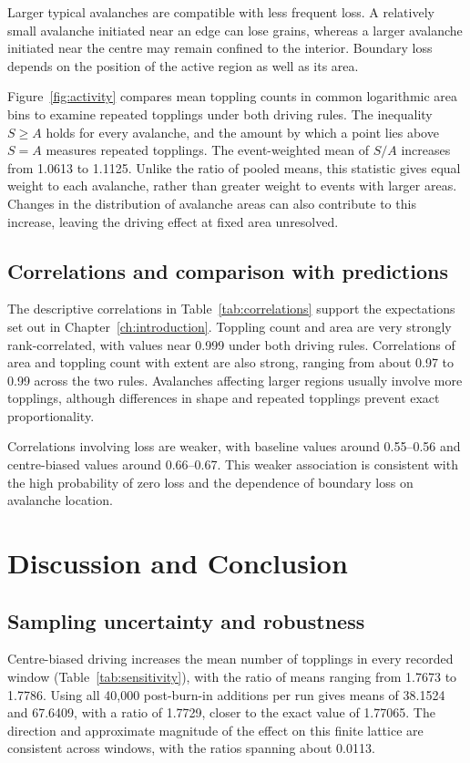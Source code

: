 \documentclass[11pt,a4paper,oneside]{report}
\numberwithin{equation}{chapter}
\begin{document}
Larger typical avalanches are compatible with less frequent loss. A relatively small avalanche initiated near an edge can lose grains, whereas a larger avalanche initiated near the centre may remain confined to the interior. Boundary loss depends on the position of the active region as well as its area.

\begin{samepage}
Figure~\ref{fig:activity} compares mean toppling counts in common logarithmic area bins to examine repeated topplings under both driving rules. The inequality $S\geq A$ holds for every avalanche, and the amount by which a point lies above $S=A$ measures repeated topplings. The event-weighted mean of $S/A$ increases from 1.0613 to 1.1125. Unlike the ratio of pooled means, this statistic gives equal weight to each avalanche, rather than greater weight to events with larger areas. Changes in the distribution of avalanche areas can also contribute to this increase, leaving the driving effect at fixed area unresolved.

\end{samepage}

\FloatBarrier

\section{Correlations and comparison with predictions}
\label{sec:correlations}
The descriptive correlations in Table~\ref{tab:correlations} support the expectations set out in Chapter~\ref{ch:introduction}. Toppling count and area are very strongly rank-correlated, with values near 0.999 under both driving rules. Correlations of area and toppling count with extent are also strong, ranging from about 0.97 to 0.99 across the two rules. Avalanches affecting larger regions usually involve more topplings, although differences in shape and repeated topplings prevent exact proportionality.

Correlations involving loss are weaker, with baseline values around 0.55--0.56 and centre-biased values around 0.66--0.67. This weaker association is consistent with the high probability of zero loss and the dependence of boundary loss on avalanche location.

\FloatBarrier

\chapter{Discussion and Conclusion}
\label{ch:discussion}
\section{Sampling uncertainty and robustness}
\label{sec:uncertainty}
Centre-biased driving increases the mean number of topplings in every recorded window (Table~\ref{tab:sensitivity}), with the ratio of means ranging from 1.7673 to 1.7786. Using all 40,000 post-burn-in additions per run gives means of 38.1524 and 67.6409, with a ratio of 1.7729, closer to the exact value of 1.77065. The direction and approximate magnitude of the effect on this finite lattice are consistent across windows, with the ratios spanning about 0.0113.

\end{document}
